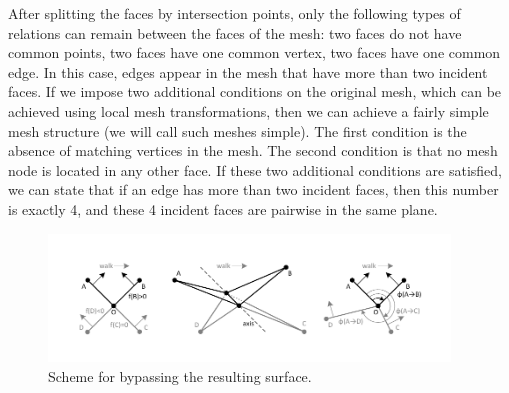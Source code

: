 \documentclass[
11pt,%
tightenlines,%
twoside,%
onecolumn,%
nofloats,%
nobibnotes,%
nofootinbib,%
superscriptaddress,%
noshowpacs,%
centertags]%
{revtex4-2}
\begin{document}
After splitting the faces by intersection points, only the following types of relations can remain between the faces of the mesh: two faces do not have common points, two faces have one common vertex, two faces have one common edge.
In this case, edges appear in the mesh that have more than two incident faces.
If we impose two additional conditions on the original mesh, which can be achieved using local mesh transformations, then we can achieve a fairly simple mesh structure (we will call such meshes simple).
The first condition is the absence of matching vertices in the mesh.
The second condition is that no mesh node is located in any other face.
If these two additional conditions are satisfied, we can state that if an edge has more than two incident faces, then this number is exactly 4, and these 4 incident faces are pairwise in the same plane.

\begin{figure}[h]
\includegraphics[width=0.95\textwidth]{pics/pic_walk_1_size.pdf}
\caption{Scheme for bypassing the resulting surface.}\label{fig:pic_walk}
\end{figure}
\end{document}
